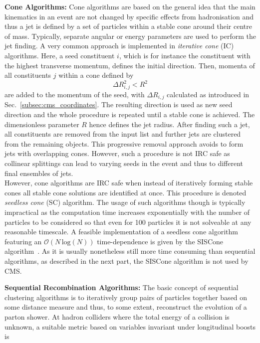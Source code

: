 \begin{description}
 \item \textbf{Cone Algorithms:} Cone algorithms are based on the general idea that the main kinematics in an event are not changed by specific effects from hadronisation and thus a jet is defined by a set of particles within a stable cone around their centre of mass. Typically, separate angular or energy parameters are used to perform the jet finding. A very common approach is implemented in \textit{iterative cone} (IC) algorithms. Here, a seed constituent $i$, which is for instance the constituent with the highest transverse momentum, defines the initial direction. Then, momenta of all constituents $j$ within a cone defined by
\begin{equation}
 \Delta R_{i,j}^2 < R^2
\end{equation}
are added to the momentum of the seed, with $\Delta R_{i,j}$ calculated as introduced in Sec.~\ref{subsec:cms_coordinates}. The resulting direction is used as new seed direction and the whole procedure is repeated until a stable cone is achieved. The dimensionless parameter $R$ hence defines the jet radius. After finding such a jet, all constituents are removed from the input list and further jets are clustered from the remaining objects. This progressive removal approach avoids to form jets with overlapping cones. However, such a procedure is not IRC safe as collinear splittings can lead to varying seeds in the event and thus to different final ensembles of jets. \\
However, cone algorithms are IRC safe when instead of iteratively forming stable cones all stable cone solutions are identified at once. This procedure is denoted \textit{seedless cone} (SC) algorithm. The usage of such algorithms though is typically impractical as the computation time increases exponentially with the number of particles to be considered so that even for 100 particles it is not solveable at any reasonable timescale. A feasible implementation of a seedless cone algorithm featuring an $\mathcal{O}(N \, \mathrm{log} (N))$ time-dependence is given by the SISCone algorithm~\cite{Salam:2007xv}. As it is usually nonetheless still more time consuming than sequential algorithms, as described in the next part, the SISCone algorithm is not used by CMS.
 \item \textbf{Sequential Recombination Algorithms:} The basic concept of sequential clustering algorithms is to iteratively group pairs of particles together based on some distance measure and thus, to some extent, reconstruct the evolution of a parton shower. At hadron colliders where the total energy of a collision is unknown, a suitable metric based on variables invariant under longitudinal boosts is 

\end{description}
